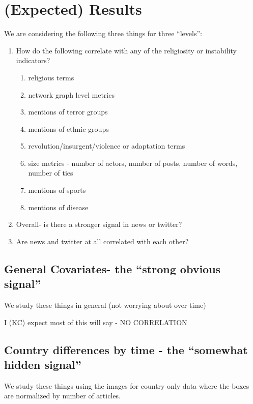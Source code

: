 
\section{(Expected) Results}

We are considering the following three things for three ``levels'':

\begin{enumerate}

\item How do the following correlate with any of the religiosity or instability indicators?
    \begin{enumerate}
        \item religious terms
        \item network graph level metrics
        \item mentions of terror groups
        \item mentions of ethnic groups
        \item revolution/insurgent/violence or adaptation terms
        \item size metrics - number of actors, number of posts,
        number of words, number of ties
        \item mentions of sports
        \item mentions of disease
    \end{enumerate}

\item Overall- is there a stronger signal in news or twitter?  

\item Are news and twitter at all correlated with each other?


\end{enumerate}


\subsection{General Covariates- the ``strong obvious signal''}

We study these things in general (not worrying about over time) 

I (KC) expect most of this will say - NO CORRELATION


\subsection{Country differences by time - the ``somewhat hidden signal''}

We study these things using the images for country only data where the boxes are normalized by number of articles.


